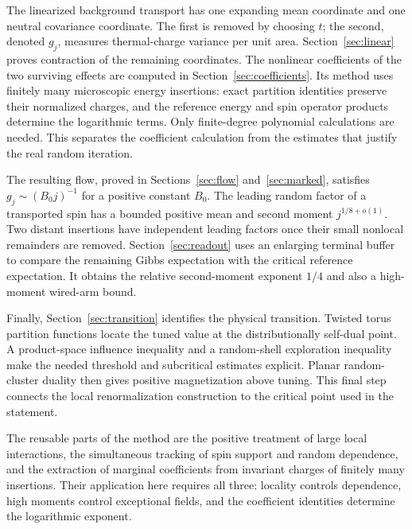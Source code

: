 The linearized background transport has one expanding mean coordinate
and one neutral covariance coordinate. The first is removed by choosing
$t$; the second, denoted $g_j$, measures thermal-charge variance per unit
area. Section~\ref{sec:linear} proves contraction of the remaining
coordinates. The nonlinear coefficients of the two surviving effects are
computed in Section~\ref{sec:coefficients}. Its method uses finitely many
microscopic energy insertions: exact partition identities preserve their
normalized charges, and the reference energy and spin operator products
determine the logarithmic terms. Only finite-degree polynomial calculations
are needed. This separates the coefficient calculation from the estimates
that justify the real random iteration.

The resulting flow, proved in Sections~\ref{sec:flow} and~\ref{sec:marked},
satisfies $g_j\sim(B_0j)^{-1}$ for a positive constant $B_0$. The leading
random factor of a transported spin has a bounded positive mean and
second moment $j^{1/8+o(1)}$. Two distant insertions have independent
leading factors once their small nonlocal remainders are removed.
Section~\ref{sec:readout} uses an enlarging terminal buffer to compare
the remaining Gibbs expectation with the critical reference expectation.
It obtains the relative second-moment exponent $1/4$ and also a high-moment
wired-arm bound.

Finally, Section~\ref{sec:transition} identifies the physical transition.
Twisted torus partition functions locate the tuned value at the
distributionally self-dual point. A product-space influence inequality
and a random-shell exploration inequality make the needed threshold and
subcritical estimates explicit. Planar random-cluster duality then gives
positive magnetization above tuning. This final step connects the local
renormalization construction to the critical point used in the statement.

The reusable parts of the method are the positive treatment of large
local interactions, the simultaneous tracking of spin support and random
dependence, and the extraction of marginal coefficients from invariant
charges of finitely many insertions. Their application here requires all
three: locality controls dependence, high moments control exceptional
fields, and the coefficient identities determine the logarithmic exponent.
